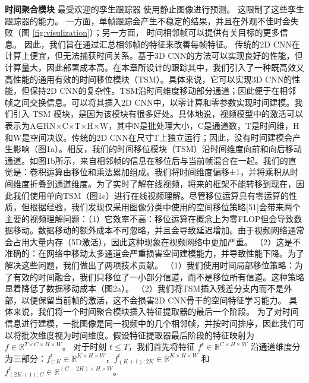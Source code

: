 \textbf{时间聚合模块}
最受欢迎的孪生跟踪器 \cite{SiamRPN++, Wang2018SiamMask} 使用静止图像进行预测。%
这限制了这些孪生跟踪器的能力。
一方面，单帧跟踪会产生不稳定的结果，并且在外观不佳时会失败（图 \ref{fig:visulization}）；另一方面，
时间相邻帧可以提供有关目标的更多信息。
因此，我们旨在通过汇总相邻帧的特征来改善每帧特征。
传统的2D CNN在计算上便宜，但无法捕获时间关系。基于3D CNN的方法可以实现良好的性能，但计算量大，因此部署成本高。在本章所设计的跟踪其中，我们引入了一种既高效又高性能的通用有效的时间移位模块（TSM）。具体来说，它可以实现3D CNN的性能，但保持2D CNN的复杂性。TSM沿时间维度移动部分通道；因此便于在相邻帧之间交换信息。可以将其插入2D CNN中，以零计算和零参数实现时间建模。我们引入 TSM 模块，是因为该模块有很多好处。具体地说，视频模型中的激活可以表示为A∈RN×C×T×H×W，其中N是批处理大小，C是通道数，T是时间维，H和W是空间决议。传统的2D CNN在尺寸T上独立运行；因此，没有时间建模会产生影响（图1a）。相反，我们的时间移位模块（TSM）沿时间维度向前和向后移动通道。如图1b所示，来自相邻帧的信息在移位后与当前帧混合在一起。我们的直觉是：卷积运算由移位和乘法累加组成。我们将时间维度偏移±1，并将乘积从时间维度折叠到通道维度。为了实时了解在线视频，将来的框架不能转移到现在，因此我们使用单向TSM（图1c）进行在线视频理解。尽管移位运算具有零运算的性质，但根据经验，我们发现仅采用图像分类中使用的空间移位策略[51]会带来两个主要的视频理解问题：（1）它效率不高：移位运算在概念上为零FLOP但会导致数据移动。数据移动的额外成本不可忽略，并且会导致延迟增加。由于视频网络通常会占用大量内存（5D激活），因此这种现象在视频网络中更加严重。 （2）这是不准确的：在网络中移动太多通道会严重损害空间建模能力，并导致性能下降。为了解决这些问题，我们做出了两项技术贡献。 （1）我们使用时间局部移位策略：为了有效的时间融合，我们只移位了一小部分信道，而不是移位所有信道。这种策略显着降低了数据移动成本（图2a）。 （2）我们将TSM插入残差分支内而不是外部，以便保留当前帧的激活，这不会损害2D CNN骨干的空间特征学习能力。%
具体来说，我们将一个时间聚合模块插入特征提取器的最后一个阶段。
为了对时间信息进行建模，一批图像是同一视频中的几个相邻帧，并按时间排序，因此我们可以将批次维度视为时间维度。假设特征提取器最后阶段的特征映射为 $f \in \mathbb R ^ {T \times C \times H \times W}$。
对于时刻 $t \leq T$，我们首先将特征 $f^t \in \mathbb R ^ {C \times H \times W}$ 沿通道维度分为三部分：$f_{1:K}^t \in \mathbb R ^ {K \times H \times W}$，$f_{(K+1):2K}^t \in \mathbb R ^ {K \times H \times W}$ 和 $f_{(2K+1):C}^t \in \mathbb R ^ {(C-2K) \times H \times W}$。
